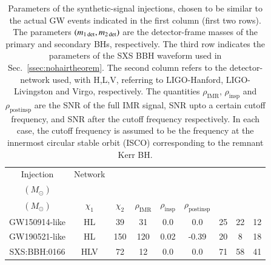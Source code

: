 \documentclass[twocolumn,prd,aps,superscriptaddress,preprintnumbers,tightenlines,showpacs,nofootinbib,eqsecnum,amsfonts,amsmath]{revtex4-1}
\newcommand{\Mo}{M_{\odot}}
\begin{document}
\begin{table}[h!]
\begin{center}
\begin{tabular}{ c|c|c|c|c|c|c|c|c }

Injection &  Network & \makecell{$m_{\rm 1\,det}$ \\$(\Mo)$} &  \makecell{$m_{\rm 2\,det}$ \\ $(\Mo)$} & $\chi_{1}$ & $\chi_{2}$ & $\rho_\text{IMR}$ & $\rho_\text{insp}$ & $\rho_\text{postinsp}$ \\
 \hline
 GW150914-like & HL &39 & 31 & 0.0 & 0.0 & 25 & 22 & 12 \\
 GW190521-like & HL & 150 & 120 & 0.02 & -0.39 & 20 & 8 & 18 \\
 SXS:BBH:0166 & HLV &72 & 12  & 0.0 & 0.0 & 71 & 58 & 41 \\

\end{tabular}
\caption{Parameters of the synthetic-signal injections, chosen to be similar to the actual GW events indicated in the first column (first two rows). The parameters $(m_{\rm 1 \,det}, m_{\rm 2 \,det})$ are the detector-frame masses of the primary and secondary BHs, respectively. The third row indicates the parameters of the SXS BBH waveform used in Sec.~\ref{ssec:nohairtheorem}. The second column refers to the detector-network used, with H,L,V, referring to LIGO-Hanford, LIGO-Livingston and Virgo, respectively. The quantities $\rho_\text{IMR}$, $\rho_\text{insp}$ and $\rho_\text{postinsp}$ are the SNR of the full IMR signal, SNR upto a certain cutoff frequency, and SNR after the cutoff frequency respectively. In each case, the cutoff frequency is assumed to be the frequency at the innermost circular stable orbit (ISCO) corresponding to the remnant Kerr BH.}
\label{tab:injection_values}
\end{center}
\end{table}
\end{document}
